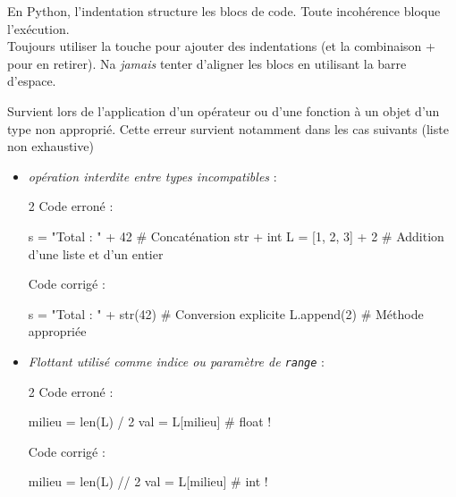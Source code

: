 \documentclass[11pt,a4paper]{article}
\begin{document}
\begin{tcolorbox}[left=0cm,title=\bf{\faBug \; 2. Erreurs d'indentation (IndentationError)},colbacktitle=cfond]
En Python, l'indentation structure les blocs de code. Toute incohérence bloque l'exécution. \\
{\small \important} Toujours utiliser la touche \keys{\tab} pour ajouter des indentations (et la combinaison \keys{\shift} + \keys{\tab} pour en retirer). Na \textit{jamais} tenter d'aligner les blocs en utilisant la barre d'espace.
\end{tcolorbox}

\begin{tcolorbox}[left=0cm,title=\bf{\faBug \; 3. Erreurs de type (TypeError)},colbacktitle=cfond]
Survient lors de l'application d'un opérateur ou d'une fonction à un objet d'un type non approprié. Cette erreur survient notamment dans les cas suivants (liste non exhaustive)
\begin{itemize}
	\item[\textbullet] \textit{opération interdite entre types incompatibles} :
	\setlength{\multicolsep}{0pt}
	\begin{multicols}{2}
		\textcolor{BrickRed}{\faTimesCircle \; Code erroné :}
		\begin{python}
s = "Total : " + 42
# Concaténation str + int
L = [1, 2, 3] + 2
# Addition d'une liste et d'un entier
		\end{python}
		\textcolor{OliveGreen}{\faCheckCircle \; Code corrigé :}
		\begin{python}
s = "Total : " + str(42)
# Conversion explicite
L.append(2)
# Méthode appropriée
		\end{python}
	\end{multicols}

	\item[\textbullet] \textit{Flottant utilisé comme indice ou paramètre de \texttt{range}} :
	\begin{multicols}{2}
		\textcolor{BrickRed}{\faTimesCircle \; Code erroné :}
		\begin{python}
milieu = len(L) / 2
val = L[milieu] # float !
		\end{python}
		\textcolor{OliveGreen}{\faCheckCircle \; Code corrigé :}
		\begin{python}
milieu = len(L) // 2
val = L[milieu] # int !
		\end{python}
	\end{multicols}


\end{itemize}
\end{tcolorbox}
\end{document}
